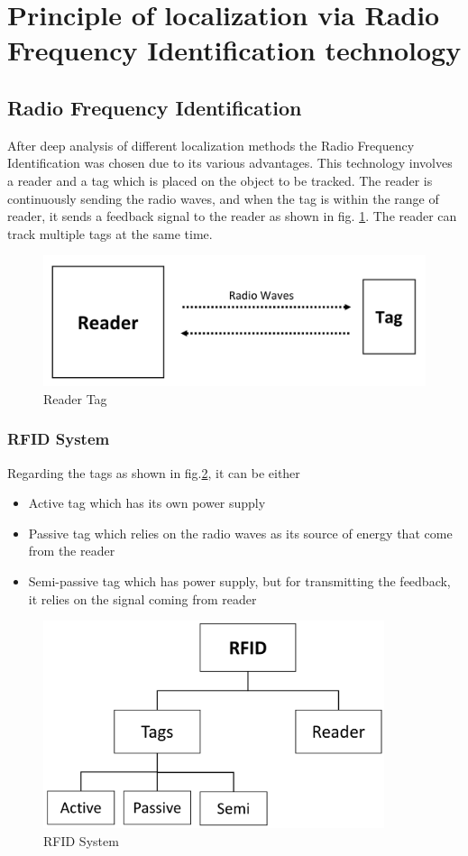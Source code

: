\section{Principle of localization via Radio Frequency Identification technology} \label{Sec_theor}
\subsection{Radio Frequency Identification}
After deep analysis of different localization methods the Radio Frequency Identification\cite{rfid.application}\cite{rfid.application2} was chosen due to its various advantages.
This technology involves a reader and a tag which is placed on the object to be tracked. The reader is continuously sending the radio waves, and when the tag is within the range of reader, it sends a feedback signal to the reader as shown in fig. \ref{reader_tag}. The reader can track multiple tags at the same time.
\begin{figure}[!htbp]
	\centering
	\includegraphics[width = 13cm]{Pictures/readertag}
	\caption{Reader Tag}
	\label{reader_tag}
\end{figure}
\subsubsection{RFID System}
Regarding the tags as shown in fig.\ref{rfid_system}, it can be either
\begin{itemize}
	\item Active tag which has its own power supply 
	\item Passive tag which relies on the radio waves as its source of energy that come from the reader 
	\item Semi-passive tag which has power supply, but for transmitting the feedback, it relies on the signal coming from reader
\end{itemize}
\begin{figure}[!htbp]
	\centering
	\includegraphics[width = 10cm]{Pictures/rfidsystem}
	\caption{RFID System}
	\label{rfid_system}
\end{figure}

